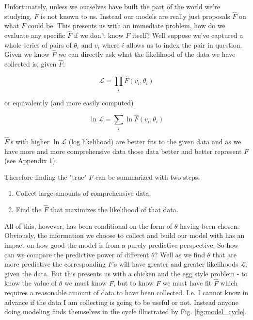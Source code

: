 \documentclass[11pt]{article}
\begin{document}
Unfortunately, unless we ourselves have built the part of the world we're studying, $F$ is not known to us. Instead our models are really just proposals $\hat{F}$ on what $F$ could be. This presents us with an immediate problem, how do we evaluate any specific $\hat{F}$ if we don't know $F$ itself? Well suppose we've captured a whole series of pairs of $\theta_i$ and $v_i$ where $i$ allows us to index the pair in question. Given we know $\hat{F}$ we can directly ask what the likelihood of the data we have collected is, given $\hat{F}$:

$$\mathcal{L}=\prod_i \hat{F}(v_i, \theta_i)$$

or equivalently (and more easily computed)

$$\ln \mathcal{L} = \sum_i \ln \hat{F}(v_i, \theta_i)$$

$\hat{F}$'s with higher $\ln \mathcal{L}$ (log likelihood) are better fits to the given data and as we have more and more comprehensive data those data better and better represent $F$ (see Appendix 1).

Therefore finding the "true" $F$ can be summarized with two steps:

\begin{enumerate}
\item Collect large amounts of comprehensive data.
\item Find the $\hat{F}$ that maximizes the likelihood of that data.
\end{enumerate}

All of this, however, has been conditional on the form of $\theta$ having been chosen. Obviously, the information we choose to collect and build our model with has an impact on how good the model is from a purely predictive perspective. So how can we compare the predictive power of different $\theta$? Well as we find $\theta$ that are more predictive the corresponding $F$'s will have greater and greater likelihoods $\mathcal{L}$, given the data. But this presents us with a chicken and the egg style problem - to know the value of $\theta$ we must know $F$, but to know $F$ we must have fit $\hat{F}$ which requires a reasonable amount of data to have been collected. I.e. I cannot know in advance if the data I am collecting is going to be useful or not. Instead anyone doing modeling finds themselves in the cycle illustrated by Fig. \ref{fig:model_cycle}.
\end{document}
